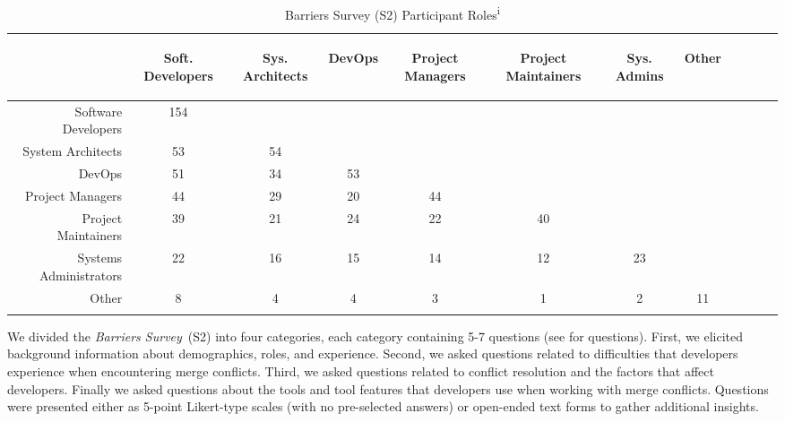 \begin{table}[!htbp]
\caption{Barriers Survey (S2) Participant Roles\textsuperscript{i}}
\label{survey_roles}
\centering
\begin{tabularx}{\textwidth}{@{}r|*{10}{C}c@{}}
\toprule
\addlinespace[4.5em]
	& \begin{rotate}{30} Soft. Developers \end{rotate} 
	& \begin{rotate}{30} Sys. Architects \end{rotate} 
	& \begin{rotate}{30} DevOps \end{rotate} 
	& \begin{rotate}{30} Project Managers \end{rotate}
	& \begin{rotate}{30} Project Maintainers \end{rotate}
	& \begin{rotate}{30} Sys. Admins \end{rotate}
	& \begin{rotate}{30} Other \end{rotate}\\
\midrule
	Software Developers & 154 & & & & & & \\
	System Architects & 53 & 54 & & & & & \\
	DevOps & 51 & 34 & 53 & & & & \\
	Project Managers & 44 & 29 & 20 & 44 & & & \\
	Project Maintainers & 39 & 21 & 24 & 22 & 40 & & \\
	Systems Administrators & 22 & 16 & 15 & 14 & 12 & 23 & \\
	Other & 8 & 4 & 4 & 3 & 1 & 2 & 11 \\
\bottomrule
\end{tabularx}
\end{table}

We divided the \textit{Barriers Survey}~(S2) into four categories, each category containing 5-7 questions (see \cite{companion_site} for questions).
First, we elicited background information about demographics, roles, and experience.
Second, we asked questions related to difficulties that developers experience when encountering merge conflicts.
Third, we asked questions related to conflict resolution and the factors that affect developers.
Finally we asked questions about the tools and tool features that developers use when working with merge conflicts.
Questions were presented either as 5-point Likert-type scales (with no pre-selected answers) or open-ended text forms to gather additional insights.


